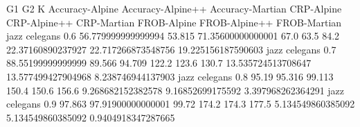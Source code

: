 G1 G2 K Accuracy-Alpine Accuracy-Alpine++ Accuracy-Martian CRP-Alpine CRP-Alpine++ CRP-Martian FROB-Alpine FROB-Alpine++ FROB-Martian
jazz celegans 0.6 56.779999999999994 53.815 71.35600000000001 67.0 63.5 84.2 22.37160890237927 22.717266873548756 19.225156187590603
jazz celegans 0.7 88.55199999999999 89.566 94.709 122.2 123.6 130.7 13.535724513708647 13.577499427904968 8.238746944137903
jazz celegans 0.8 95.19 95.316 99.113 150.4 150.6 156.6 9.268682152382578 9.16852699175592 3.397968262364291
jazz celegans 0.9 97.863 97.91900000000001 99.72 174.2 174.3 177.5 5.134549860385092 5.134549860385092 0.9404918347287665
